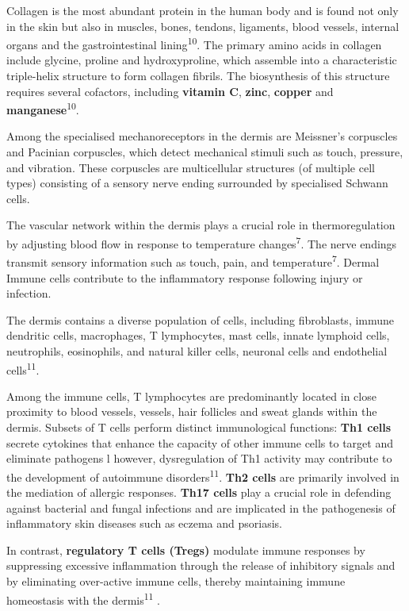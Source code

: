 \documentclass[
]{article}
\begin{document}
Collagen is the most abundant protein in the human body and is found not
only in the skin but also in muscles, bones, tendons, ligaments, blood
vessels, internal organs and the gastrointestinal
lining\textsuperscript{10}. The primary amino acids in collagen include
glycine, proline and hydroxyproline, which assemble into a
characteristic triple-helix structure to form collagen fibrils. The
biosynthesis of this structure requires several cofactors, including
\textbf{vitamin C}, \textbf{zinc}, \textbf{copper} and
\textbf{manganese}\textsuperscript{10}.

Among the specialised mechanoreceptors in the dermis are Meissner's
corpuscles and Pacinian corpuscles, which detect mechanical stimuli such
as touch, pressure, and vibration. These corpuscles are multicellular
structures (of multiple cell types) consisting of a sensory nerve ending
surrounded by specialised Schwann cells.

The vascular network within the dermis plays a crucial role in
thermoregulation by adjusting blood flow in response to temperature
changes\textsuperscript{7}. The nerve endings transmit sensory
information such as touch, pain, and temperature\textsuperscript{7}.
Dermal Immune cells contribute to the inflammatory response following
injury or infection.

The dermis contains a diverse population of cells, including
fibroblasts, immune dendritic cells, macrophages, T lymphocytes, mast
cells, innate lymphoid cells, neutrophils, eosinophils, and natural
killer cells, neuronal cells and endothelial cells\textsuperscript{11}.

Among the immune cells, T lymphocytes are predominantly located in close
proximity to blood vessels, vessels, hair follicles and sweat glands
within the dermis. Subsets of T cells perform distinct immunological
functions: \textbf{Th1 cells } secrete cytokines that enhance the
capacity of other immune cells to target and eliminate pathogens l
however, dysregulation of Th1 activity may contribute to the development
of autoimmune disorders\textsuperscript{11}. \textbf{Th2 cells} are
primarily involved in the mediation of allergic responses. \textbf{Th17
cells} play a crucial role in defending against bacterial and fungal
infections and are implicated in the pathogenesis of inflammatory skin
diseases such as eczema and psoriasis.

In contrast, \textbf{regulatory T cells (Tregs)} modulate immune
responses by suppressing excessive inflammation through the release of
inhibitory signals and by eliminating over-active immune cells, thereby
maintaining immune homeostasis with the dermis\textsuperscript{11} .
\end{document}
